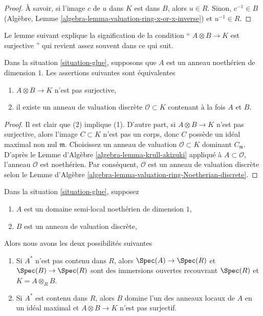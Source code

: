 \begin{proof}
À savoir, si l'image $c$ de $u$ dans $K$ est
dans $B$, alors $u \in R$. Sinon, $c^{-1} \in
B$ (Algèbre, Lemme
\ref{algebra-lemma-valuation-ring-x-or-x-inverse}) et $u^{-1} \in R$.
\end{proof}

\noindent
Le lemme suivant explique la signification de la
condition `` $A \otimes B \to K$ est surjective
'' qui revient assez souvent dans ce qui suit.

\begin{lemma}
\label{lemma-glue-separated}
Dans la situation \ref{situation-glue}, supposons que $A$ est un anneau
noethérien de dimension $1$. Les assertions suivantes sont équivalentes
\begin{enumerate}
\item $A \otimes B \to K$ n'est pas surjective,
\item il existe un anneau de valuation discrète
$\mathcal{O} \subset K$ contenant à la fois $A$ et $B$.
\end{enumerate}
\end{lemma}

\begin{proof}
Il est clair que (2) implique (1). D'autre part, si $A \otimes B \to
K$ n'est pas surjective, alors l'image $C \subset K$ n'est pas un
corps, donc $C$ possède un idéal maximal non nul $\mathfrak m$.
Choisissez un anneau de valuation $\mathcal{O} \subset K$ dominant
$C_\mathfrak m$. D'après le Lemme d'Algèbre
\ref{algebra-lemma-krull-akizuki} appliqué à $A \subset \mathcal{O}$, l'anneau
$\mathcal{O}$ est noethérien. Par conséquent, $\mathcal{O}$ est un anneau de valuation
discrète selon le Lemme d'Algèbre \ref{algebra-lemma-valuation-ring-Noetherian-discrete}.
\end{proof}

\begin{lemma}
\label{lemma-semi-local}
Dans la situation \ref{situation-glue}, supposez
\begin{enumerate}
\item $A$ est un domaine semi-local noethérien de
dimension $1$, \item $B$ est un anneau de valuation discrète,
\end{enumerate}
Alors nous avons les deux possibilités suivantes
\begin{enumerate}
\item [(a)] Si $A^*$ n'est pas contenu dans $R$, alors
$\Spec(A) \to \Spec(R)$ et $\Spec(B) \to \Spec(R)$ sont
des immersions ouvertes recouvrant $\Spec(R)$ et $K = A
\otimes_R B$. \item [(b)] Si $A^*$ est contenu dans $R$,
alors $B$ domine l'un des anneaux locaux de $A$ en un
idéal maximal et $A \otimes B \to K$ n'est pas surjectif.
\end{enumerate}
\end{lemma}

